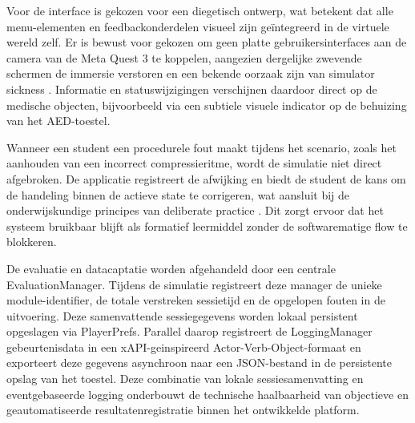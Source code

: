 Voor de interface is gekozen voor een diegetisch ontwerp, wat betekent dat alle menu-elementen en feedbackonderdelen visueel zijn geïntegreerd in de virtuele wereld zelf. Er is bewust voor gekozen om geen platte gebruikersinterfaces aan de camera van de Meta Quest 3 te koppelen, aangezien dergelijke zwevende schermen de immersie verstoren en een bekende oorzaak zijn van simulator sickness \cite{Kennedy1993SSQ}. Informatie en statuswijzigingen verschijnen daardoor direct op de medische objecten, bijvoorbeeld via een subtiele visuele indicator op de behuizing van het AED-toestel.

Wanneer een student een procedurele fout maakt tijdens het scenario, zoals het aanhouden van een incorrect compressieritme, wordt de simulatie niet direct afgebroken. De applicatie registreert de afwijking en biedt de student de kans om de handeling binnen de actieve state te corrigeren, wat aansluit bij de onderwijskundige principes van deliberate practice \cite{Fowler2015VR}. Dit zorgt ervoor dat het systeem bruikbaar blijft als formatief leermiddel zonder de softwarematige flow te blokkeren.

De evaluatie en datacaptatie worden afgehandeld door een centrale EvaluationManager. Tijdens de simulatie registreert deze manager de unieke module-identifier, de totale verstreken sessietijd en de opgelopen fouten in de uitvoering. Deze samenvattende sessiegegevens worden lokaal persistent opgeslagen via PlayerPrefs. Parallel daarop registreert de LoggingManager gebeurtenisdata in een xAPI-geinspireerd Actor-Verb-Object-formaat en exporteert deze gegevens asynchroon naar een JSON-bestand in de persistente opslag van het toestel. Deze combinatie van lokale sessiesamenvatting en eventgebaseerde logging onderbouwt de technische haalbaarheid van objectieve en geautomatiseerde resultatenregistratie binnen het ontwikkelde platform.